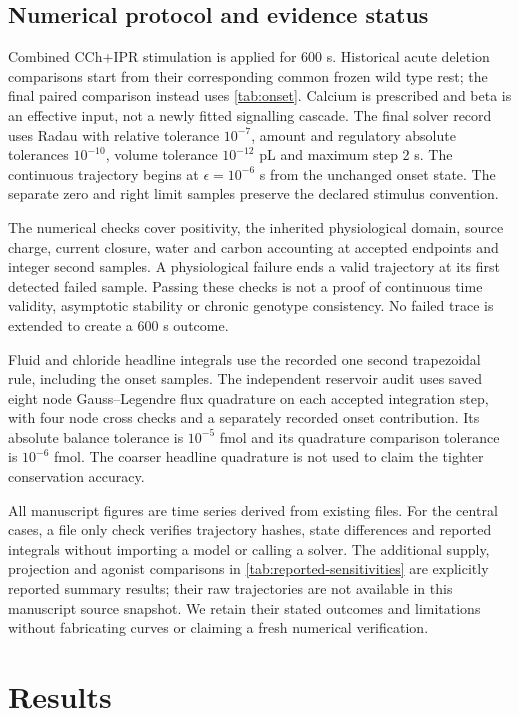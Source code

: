 \documentclass[11pt]{article}
\begin{document}
\subsection{Numerical protocol and evidence status}
\label{sec:numerics}

Combined CCh+IPR stimulation is applied for 600 s. Historical acute deletion comparisons start from their corresponding common frozen wild type rest; the final paired comparison instead uses \cref{tab:onset}. Calcium is prescribed and beta is an effective input, not a newly fitted signalling cascade. The final solver record uses Radau with relative tolerance $10^{-7}$, amount and regulatory absolute tolerances $10^{-10}$, volume tolerance $10^{-12}$ pL and maximum step 2 s. The continuous trajectory begins at $\epsilon=10^{-6}$ s from the unchanged onset state. The separate zero and right limit samples preserve the declared stimulus convention.

The numerical checks cover positivity, the inherited physiological domain, source charge, current closure, water and carbon accounting at accepted endpoints and integer second samples. A physiological failure ends a valid trajectory at its first detected failed sample. Passing these checks is not a proof of continuous time validity, asymptotic stability or chronic genotype consistency. No failed trace is extended to create a 600 s outcome.

Fluid and chloride headline integrals use the recorded one second trapezoidal rule, including the onset samples. The independent reservoir audit uses saved eight node Gauss--Legendre flux quadrature on each accepted integration step, with four node cross checks and a separately recorded onset contribution. Its absolute balance tolerance is $10^{-5}$ fmol and its quadrature comparison tolerance is $10^{-6}$ fmol. The coarser headline quadrature is not used to claim the tighter conservation accuracy.

All manuscript figures are time series derived from existing files. For the central cases, a file only check verifies trajectory hashes, state differences and reported integrals without importing a model or calling a solver. The additional supply, projection and agonist comparisons in \cref{tab:reported-sensitivities} are explicitly reported summary results; their raw trajectories are not available in this manuscript source snapshot. We retain their stated outcomes and limitations without fabricating curves or claiming a fresh numerical verification.

\section{Results}
\label{sec:results}
\end{document}
